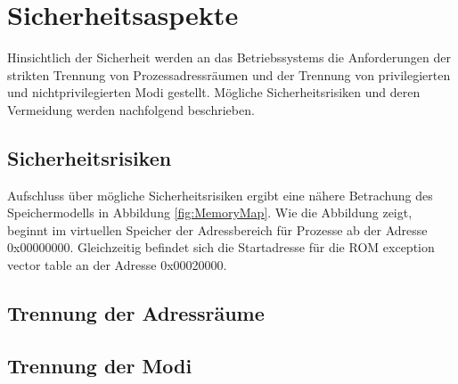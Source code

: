 \section{Sicherheitsaspekte}

Hinsichtlich der Sicherheit werden an das Betriebssystems die Anforderungen der strikten Trennung von Prozessadressräumen und der Trennung von privilegierten und nichtprivilegierten Modi gestellt. Mögliche Sicherheitsrisiken und deren Vermeidung werden nachfolgend beschrieben.

 

\subsection{Sicherheitsrisiken}

Aufschluss über mögliche Sicherheitsrisiken ergibt eine nähere Betrachung des Speichermodells in Abbildung \ref{fig:MemoryMap}. Wie die Abbildung zeigt, beginnt im virtuellen Speicher der Adressbereich für Prozesse ab der Adresse 0x00000000. Gleichzeitig befindet sich die Startadresse für die ROM exception vector table an der Adresse 0x00020000.


\subsection{Trennung der Adressräume}

\subsection{Trennung der Modi}
\pagebreak 